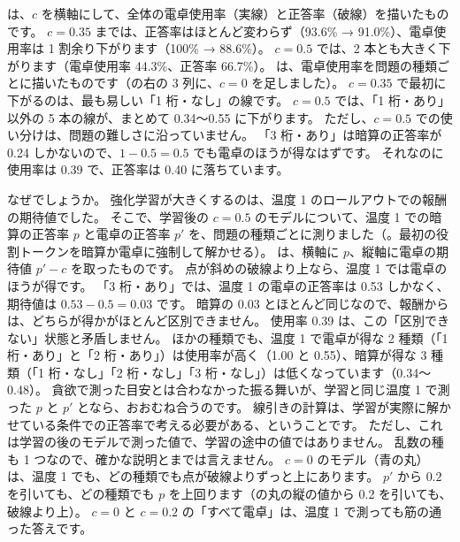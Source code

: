 は、$c$ を横軸にして、全体の電卓使用率（実線）と正答率（破線）を描いたものです。
$c=0.35$ までは、正答率はほとんど変わらず（93.6\% → 91.0\%）、電卓使用率は 1 割余り下がります（100\% → 88.6\%）。
$c=0.5$ では、2 本とも大きく下がります（電卓使用率 44.3\%、正答率 66.7\%）。
は、電卓使用率を問題の種類ごとに描いたものです（の右の 3 列に、$c=0$ を足しました）。
$c=0.35$ で最初に下がるのは、最も易しい「1 桁・なし」の線です。
$c=0.5$ では、「1 桁・あり」以外の 5 本の線が、まとめて 0.34〜0.55 に下がります。
ただし、$c=0.5$ での使い分けは、問題の難しさに沿っていません。
「3 桁・あり」は暗算の正答率が 0.24 しかないので、$1-0.5=0.5$ でも電卓のほうが得なはずです。
それなのに使用率は 0.39 で、正答率は 0.40 に落ちています。

なぜでしょうか。
強化学習が大きくするのは、温度 1 のロールアウトでの報酬の期待値でした。
そこで、学習後の $c=0.5$ のモデルについて、温度 1 での暗算の正答率 $p$ と電卓の正答率 $p'$ を、問題の種類ごとに測りました（。最初の役割トークンを暗算か電卓に強制して解かせる）。
は、横軸に $p$、縦軸に電卓の期待値 $p'-c$ を取ったものです。
点が斜めの破線より上なら、温度 1 では電卓のほうが得です。
「3 桁・あり」では、温度 1 の電卓の正答率は 0.53 しかなく、期待値は $0.53-0.5=0.03$ です。
暗算の 0.03 とほとんど同じなので、報酬からは、どちらが得かがほとんど区別できません。
使用率 0.39 は、この「区別できない」状態と矛盾しません。
ほかの種類でも、温度 1 で電卓が得な 2 種類（「1 桁・あり」と「2 桁・あり」）は使用率が高く（1.00 と 0.55）、暗算が得な 3 種類（「1 桁・なし」「2 桁・なし」「3 桁・なし」）は低くなっています（0.34〜0.48）。
貪欲で測った目安とは合わなかった振る舞いが、学習と同じ温度 1 で測った $p$ と $p'$ となら、おおむね合うのです。
線引きの計算は、学習が実際に解かせている条件での正答率で考える必要がある、ということです。
ただし、これは学習の後のモデルで測った値で、学習の途中の値ではありません。
乱数の種も 1 つなので、確かな説明とまでは言えません。
$c=0$ のモデル（青の丸）は、温度 1 でも、どの種類でも点が破線よりずっと上にあります。
$p'$ から $0.2$ を引いても、どの種類でも $p$ を上回ります（の丸の縦の値から 0.2 を引いても、破線より上）。
$c=0$ と $c=0.2$ の「すべて電卓」は、温度 1 で測っても筋の通った答えです。

